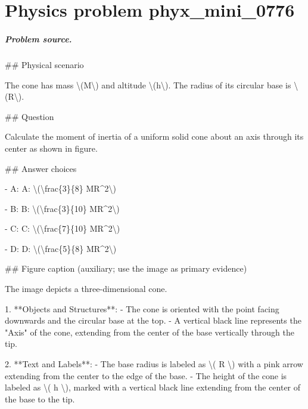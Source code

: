
\chapter{Physics problem phyx\_mini\_0776}
\label{ch:PhyXMiniProblems_problem_phyx_mini_0776}

\paragraph{Problem source.}
\#\# Physical scenario

The cone has mass \textbackslash{}(M\textbackslash{}) and altitude \textbackslash{}(h\textbackslash{}). The radius of its circular base is \textbackslash{}(R\textbackslash{}).

\#\# Question

Calculate the moment of inertia of a uniform solid cone about an axis through its center as shown in figure.

\#\# Answer choices

- A: A: \textbackslash{}(\textbackslash{}frac\{3\}\{8\} MR\textasciicircum{}2\textbackslash{})

- B: B: \textbackslash{}(\textbackslash{}frac\{3\}\{10\} MR\textasciicircum{}2\textbackslash{})

- C: C: \textbackslash{}(\textbackslash{}frac\{7\}\{10\} MR\textasciicircum{}2\textbackslash{})

- D: D: \textbackslash{}(\textbackslash{}frac\{5\}\{8\} MR\textasciicircum{}2\textbackslash{})

\#\# Figure caption (auxiliary; use the image as primary evidence)

The image depicts a three-dimensional cone. 

1. **Objects and Structures**:
   - The cone is oriented with the point facing downwards and the circular base at the top.
   - A vertical black line represents the "Axis" of the cone, extending from the center of the base vertically through the tip.

2. **Text and Labels**:
   - The base radius is labeled as \textbackslash{}( R \textbackslash{}) with a pink arrow extending from the center to the edge of the base.
   - The height of the cone is labeled as \textbackslash{}( h \textbackslash{}), marked with a vertical black line extending from the center of the base to the tip.

